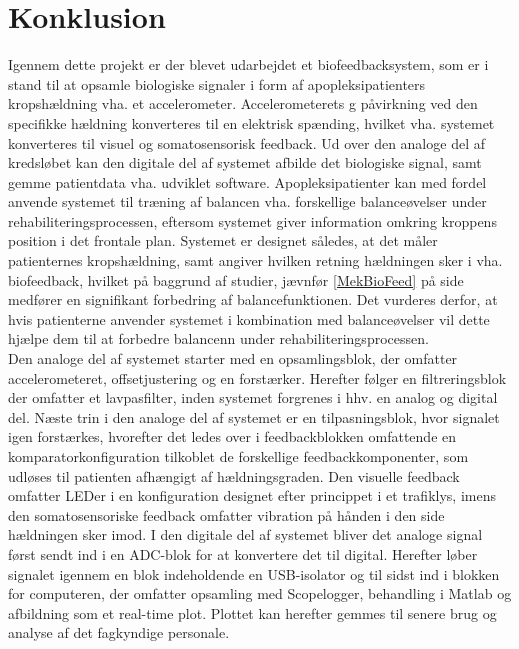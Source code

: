 \section{Konklusion}
Igennem dette projekt er der blevet udarbejdet et biofeedbacksystem, som er i stand til at opsamle biologiske signaler i form af apopleksipatienters kropshældning vha. et accelerometer. Accelerometerets g påvirkning ved den specifikke hældning konverteres til en elektrisk spænding, hvilket vha. systemet konverteres til visuel og somatosensorisk feedback. Ud over den analoge del af kredsløbet kan den digitale del af systemet afbilde det biologiske signal, samt gemme patientdata vha. udviklet software. Apopleksipatienter kan med fordel anvende systemet til træning af balancen vha. forskellige balanceøvelser under rehabiliteringsprocessen, eftersom systemet giver information omkring kroppens position i det frontale plan. Systemet er designet således, at det måler patienternes kropshældning, samt angiver hvilken retning hældningen sker i vha. biofeedback, hvilket på baggrund af studier, jævnfør \ref{MekBioFeed} på side \pageref{MekBioFeed} medfører en signifikant forbedring af balancefunktionen. Det vurderes derfor, at hvis patienterne anvender systemet i kombination med balanceøvelser vil dette hjælpe dem til at forbedre balancenn under rehabiliteringsprocessen.  \\
Den analoge del af systemet starter med en opsamlingsblok, der omfatter accelerometeret, offsetjustering og en forstærker. Herefter følger en filtreringsblok der omfatter et lavpasfilter, inden systemet forgrenes i hhv. en analog og digital del. Næste trin i den analoge del af systemet er en tilpasningsblok, hvor signalet igen forstærkes, hvorefter det ledes over i feedbackblokken omfattende en komparatorkonfiguration tilkoblet de forskellige feedbackkomponenter, som udløses til patienten afhængigt af hældningsgraden. Den visuelle feedback omfatter LEDer i en konfiguration designet efter princippet i et trafiklys, imens den somatosensoriske feedback omfatter vibration på hånden i den side hældningen sker imod. 
I den digitale del af systemet bliver det analoge signal først sendt ind i en ADC-blok for at konvertere det til digital. Herefter løber signalet igennem en blok indeholdende en USB-isolator og til sidst ind i blokken for computeren, der omfatter opsamling med Scopelogger, behandling i Matlab og afbildning som et real-time plot. Plottet kan herefter gemmes til senere brug og analyse af det fagkyndige personale. \\
